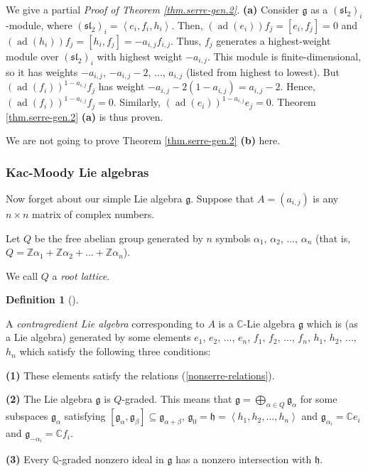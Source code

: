 \documentclass
[numbers=enddot,12pt,final,onecolumn,german,notitlepage]{scrartcl}%
\theoremstyle{definition}
\newtheorem{defi}[theo]{Definition}
\newenvironment{definition}[1][]
{\begin{defi}[#1]\begin{leftbar}}
{\end{leftbar}\end{defi}}
\begin{document}
We give a partial \textit{Proof of Theorem \ref{thm.serre-gen.2}.}
\textbf{(a)} Consider $\mathfrak{g}$ as a $\left(  \mathfrak{sl}_{2}\right)
_{i}$-module, where $\left(  \mathfrak{sl}_{2}\right)  _{i}=\left\langle
e_{i},f_{i},h_{i}\right\rangle $. Then, $\left(  \operatorname*{ad}\left(
e_{i}\right)  \right)  f_{j}=\left[  e_{i},f_{j}\right]  =0$ and $\left(
\operatorname*{ad}\left(  h_{i}\right)  \right)  f_{j}=\left[  h_{i}%
,f_{j}\right]  =-a_{i,j}f_{i,j}$. Thus, $f_{j}$ generates a highest-weight
module over $\left(  \mathfrak{sl}_{2}\right)  _{i}$ with highest weight
$-a_{i,j}$. This module is finite-dimensional, so it has weights $-a_{i,j}$,
$-a_{i,j}-2$, $...$, $a_{i,j}$ (listed from highest to lowest). But $\left(
\operatorname*{ad}\left(  f_{i}\right)  \right)  ^{1-a_{i,j}}f_{j}$ has weight
$-a_{i,j}-2\left(  1-a_{i,j}\right)  =a_{i,j}-2$. Hence, $\left(
\operatorname*{ad}\left(  f_{i}\right)  \right)  ^{1-a_{i,j}}f_{j}=0$.
Similarly, $\left(  \operatorname*{ad}\left(  e_{i}\right)  \right)
^{1-a_{i,j}}e_{j}=0$. Theorem \ref{thm.serre-gen.2} \textbf{(a)} is thus proven.

We are not going to prove Theorem \ref{thm.serre-gen.2} \textbf{(b)} here.

\subsubsection{Kac-Moody Lie algebras}

Now forget about our simple Lie algebra $\mathfrak{g}$. Suppose that
$A=\left(  a_{i,j}\right)  $ is any $n\times n$ matrix of complex numbers.

Let $Q$ be the free abelian group generated by $n$ symbols $\alpha_{1}$,
$\alpha_{2}$, $...$, $\alpha_{n}$ (that is, $Q=\mathbb{Z}\alpha_{1}%
+\mathbb{Z}\alpha_{2}+...+\mathbb{Z}\alpha_{n}$).

We call $Q$ a \textit{root lattice}.

\begin{definition}
A \textit{contragredient Lie algebra} corresponding to $A$ is a $\mathbb{C}%
$-Lie algebra $\mathfrak{g}$ which is (as a Lie algebra) generated by some
elements $e_{1}$, $e_{2}$, $...$, $e_{n}$, $f_{1}$, $f_{2}$, $...$, $f_{n}$,
$h_{1}$, $h_{2}$, $...$, $h_{n}$ which satisfy the following three conditions:

\textbf{(1)} These elements satisfy the relations (\ref{nonserre-relations}).

\textbf{(2)} The Lie algebra $\mathfrak{g}$ is $Q$-graded. This means that
$\mathfrak{g}=\bigoplus\limits_{\alpha\in Q}\mathfrak{g}_{\alpha}$ for some
subspaces $\mathfrak{g}_{\alpha}$ satisfying $\left[  \mathfrak{g}_{\alpha
},\mathfrak{g}_{\beta}\right]  \subseteq\mathfrak{g}_{\alpha+\beta}$,
$\mathfrak{g}_{0}=\mathfrak{h}=\left\langle h_{1},h_{2},...,h_{n}\right\rangle
$ and $\mathfrak{g}_{\alpha_{i}}=\mathbb{C}e_{i}$ and $\mathfrak{g}%
_{-\alpha_{i}}=\mathbb{C}f_{i}$.

\textbf{(3)} Every $\mathbb{Q}$-graded nonzero ideal in $\mathfrak{g}$ has a
nonzero intersection with $\mathfrak{h}$.
\end{definition}
\end{document}
